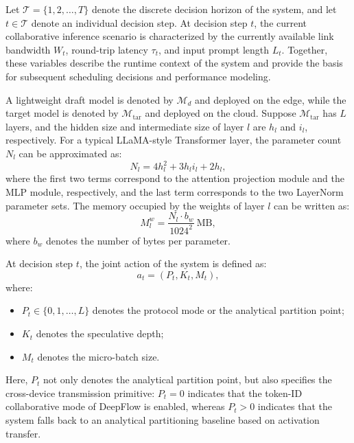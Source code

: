 \documentclass[a4paper,fleqn]{cas-dc}
\begin{document}
Let $\mathcal{T}=\{1,2,\dots,T\}$ denote the discrete decision horizon of the system, and let $t\in\mathcal{T}$ denote an individual decision step. At decision step $t$, the current collaborative inference scenario is characterized by the currently available link bandwidth $W_t$, round-trip latency $\tau_t$, and input prompt length $L_t$. Together, these variables describe the runtime context of the system and provide the basis for subsequent scheduling decisions and performance modeling.  

A lightweight draft model is denoted by $\mathcal{M}_d$ and deployed on the edge, while the target model is denoted by $\mathcal{M}_{\mathrm{tar}}$ and deployed on the cloud. Suppose $\mathcal{M}_{\mathrm{tar}}$ has $L$ layers, and the hidden size and intermediate size of layer $l$ are $h_l$ and $i_l$, respectively. For a typical LLaMA-style Transformer layer, the parameter count $N_l$ can be approximated as:
\begin{equation}
N_l = 4h_l^2 + 3h_l i_l + 2h_l,
\end{equation}
where the first two terms correspond to the attention projection module and the MLP module, respectively, and the last term corresponds to the two LayerNorm parameter sets. The memory occupied by the weights of layer $l$ can be written as:
\begin{equation}
M_l^w = \frac{N_l \cdot b_w}{1024^2}\ \text{MB},
\end{equation}
where $b_w$ denotes the number of bytes per parameter.

At decision step $t$, the joint action of the system is defined as:
\begin{equation}
a_t = (P_t, K_t, M_t),
\end{equation}
where:
\begin{itemize}
    \item $P_t \in \{0,1,\dots,L\}$ denotes the protocol mode or the analytical partition point;
    \item $K_t$ denotes the speculative depth;
    \item $M_t$ denotes the micro-batch size.
\end{itemize}

Here, $P_t$ not only denotes the analytical partition point, but also specifies the cross-device transmission primitive: $P_t=0$ indicates that the token-ID collaborative mode of DeepFlow is enabled, whereas $P_t>0$ indicates that the system falls back to an analytical partitioning baseline based on activation transfer.
\end{document}
